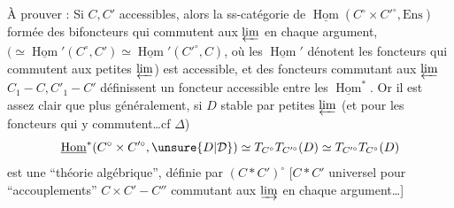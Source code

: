 
À prouver : Si $C,C'$ accessibles, alors la ss-catégorie de $\underline{\operatorname{Hom}}(C^\circ\times C'^\circ,\mathrm{Ens})$  formée des bifoncteurs qui commutent aux $\varprojlim$  en chaque argument, $(\simeq\underline{\operatorname{Hom}}'(C^\circ,C')\simeq\underline{\operatorname{Hom}}'(C'^\circ,C)$, où les $\underline{\operatorname{Hom}}'$ dénotent les foncteurs qui commutent aux petites $\varprojlim$) est accessible, et des foncteurs commutant aux $\varprojlim$ $C_1\mathbin{-}C,C'_1\mathbin{-}C'$ définissent un foncteur accessible entre les $\underline{\operatorname{Hom}}^*$. Or il est assez clair que plus généralement, si $D$  stable par petites $\varprojlim$ (et pour les foncteurs qui y commutent\ldots cf  $\Delta$)
\[
 \underline{\operatorname{Hom}}^*(C^\circ\times C'^\circ,\unsure{D|\mathcal D})\simeq T_{C^\circ}T_{C'^\circ}(D)\simeq T_{C'^\circ}T_{C^\circ}(D)
\]
est une ``théorie algébrique'', définie par $(C*C')^\circ$ [$C*C'$ universel pour ``accouplements'' $C\times C'\mathbin{-}C''$ commutant aux $\varinjlim$ en chaque argument\ldots]
